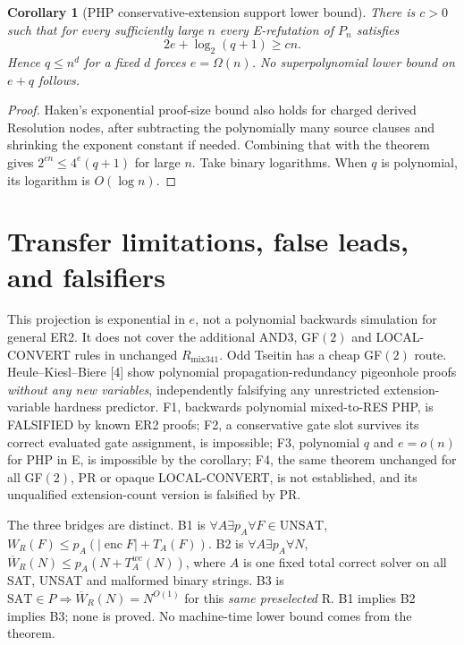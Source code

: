 \documentclass[11pt]{article}
\newtheorem{corollary}{Corollary}
\begin{document}
\begin{corollary}[PHP conservative-extension support lower bound]
There is $c>0$ such that for every sufficiently large $n$ every E-refutation of $P_n$ satisfies
\[
\boxed{2e+\log_2(q+1)\ge cn.}
\]
Hence $q\le n^d$ for a fixed $d$ forces $e=\Omega(n)$. No superpolynomial lower bound on $e+q$ follows.
\end{corollary}
\begin{proof}
Haken's exponential proof-size bound also holds for charged derived Resolution nodes, after subtracting the polynomially many source clauses and shrinking the exponent constant if needed. Combining that with the theorem gives $2^{cn}\le4^e(q+1)$ for large $n$. Take binary logarithms. When $q$ is polynomial, its logarithm is $O(\log n)$.
\end{proof}

\section*{Transfer limitations, false leads, and falsifiers}
This projection is exponential in $e$, not a polynomial backwards simulation for general ER2. It does not cover the additional AND3, GF$(2)$ and LOCAL-CONVERT rules in unchanged $R_{\mathrm{mix341}}$. Odd Tseitin has a cheap GF$(2)$ route. Heule--Kiesl--Biere [4] show polynomial propagation-redundancy pigeonhole proofs \emph{without any new variables}, independently falsifying any unrestricted extension-variable hardness predictor. F1, backwards polynomial mixed-to-RES PHP, is FALSIFIED by known ER2 proofs; F2, a conservative gate slot survives its correct evaluated gate assignment, is impossible; F3, polynomial $q$ and $e=o(n)$ for PHP in E, is impossible by the corollary; F4, the same theorem unchanged for all GF$(2)$, PR or opaque LOCAL-CONVERT, is not established, and its unqualified extension-count version is falsified by PR.

The three bridges are distinct. B1 is $\forall A\exists p_A\forall F\in\mathrm{UNSAT}$, $W_R(F)\le p_A(|\operatorname{enc}F|+T_A(F))$. B2 is $\forall A\exists p_A\forall N$, $\overline W_R(N)\le p_A(N+T_A^{wc}(N))$, where $A$ is one fixed total correct solver on all SAT, UNSAT and malformed binary strings. B3 is $\mathrm{SAT}\in P\Rightarrow\overline W_R(N)=N^{O(1)}$ for this \emph{same preselected} R. B1 implies B2 implies B3; none is proved. No machine-time lower bound comes from the theorem.
\end{document}
